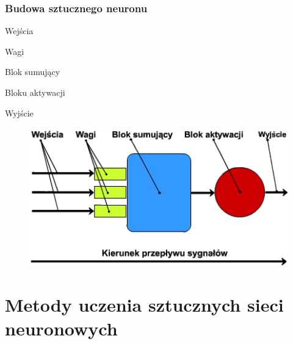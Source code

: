 \newpage
\subsubsection{Budowa sztucznego neuronu}

\begin{itemize*}
\item Wejścia
\item Wagi
\item Blok sumujący
\item Bloku aktywacji
\item Wyjście
\end{itemize*}

\begin{figure}[h]
\begin{center}
\includegraphics[width=15cm]{resources/figures/artificial_neuron.png}
\end{center}
\end{figure}
\newpage

\section{Metody uczenia sztucznych sieci neuronowych}
